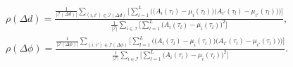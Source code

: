 \documentclass[10pt, twocolumn]{IEEEtran}
\begin{document}
{\begin{align}\label{SC}
    &\rho(\Delta d) = \frac{\frac{1}{|\mathcal{I}(\Delta d)|}\sum_{(i,i') \in \mathcal{I}(\Delta d)}\Bigg[\sum_{l = 1}^{L}\bigg(\Big(A_{i}(\tau_{l}) - \mu_{i}(\tau_{l})\Big)\Big(A_{i'}(\tau_{l}) - \mu_{i'}(\tau_{l})\Big)\bigg)\Bigg]}{\frac{1}{|\mathcal{I}|}\sum_{i \in \mathcal{I}}\bigg[\sum_{l = 1}^{L}\Big(A_{i}(\tau_{l}) - \mu_{i}(\tau_{l})\Big)^{2}\bigg]},\\
    &\rho(\Delta \phi) = \frac{\frac{1}{|\mathcal{I}(\Delta \phi)|}\sum_{(i,i') \in \mathcal{I}(\Delta \phi)}\Bigg[\sum_{l = 1}^{L}\bigg(\Big(A_{i}(\tau_{l}) - \mu_{i}(\tau_{l})\Big)\Big(A_{i'}(\tau_{l}) - \mu_{i'}(\tau_{l})\Big)\bigg)\Bigg]}{\frac{1}{|\mathcal{I}|}\sum_{i \in \mathcal{I}}\bigg[\sum_{l = 1}^{L}\Big(A_{i}(\tau_{l}) - \mu_{i}(\tau_{l})\Big)^{2}\bigg]}.
\end{align}

}
\end{document}
